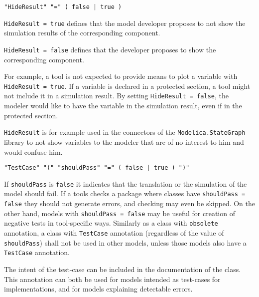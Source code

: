 \begin{annotationdefinition}[HideResult]
\begin{synopsis}[grammar]\begin{lstlisting}
"HideResult" "=" ( false | true )
\end{lstlisting}\end{synopsis}
\begin{semantics}
\lstinline!HideResult = true! defines that the model developer proposes to not show the simulation results of the corresponding component.

\lstinline!HideResult = false! defines that the developer proposes to show the corresponding component.

\begin{nonnormative}
For example, a tool is not expected to provide means to plot a variable with \lstinline!HideResult = true!.
If a variable is declared in a protected section, a tool might not include it in a simulation result.
By setting \lstinline!HideResult = false!, the modeler would like to have the variable in the simulation result, even if in the protected section.

\lstinline!HideResult! is for example used in the connectors of the \lstinline!Modelica.StateGraph! library to not show variables to the modeler that are of no interest to him and would confuse him.
\end{nonnormative}
\end{semantics}
\end{annotationdefinition}

\begin{annotationdefinition}[TestCase]
\begin{synopsis}[grammar]\begin{lstlisting}
"TestCase" "(" "shouldPass" "=" ( false | true ) ")"
\end{lstlisting}\end{synopsis}
\begin{semantics}
If \lstinline!shouldPass! is \lstinline!false! it indicates that the translation or the simulation of the model should fail.
If a tools checks a package where classes have \lstinline!shouldPass = false! they should not generate errors, and checking may even be skipped.
On the other hand, models with \lstinline!shouldPass = false! may be useful for creation of negative tests in tool-specific ways.
Similarly as a class with \lstinline!obsolete! annotation, a class with \lstinline!TestCase! annotation (regardless of the value of \lstinline!shouldPass!) shall not be used in other models, unless those models also have a \lstinline!TestCase! annotation.

\begin{nonnormative}
The intent of the test-case can be included in the documentation of the class.
This annotation can both be used for models intended as test-cases for implementations, and for models explaining detectable errors.
\end{nonnormative}
\end{semantics}
\end{annotationdefinition}


